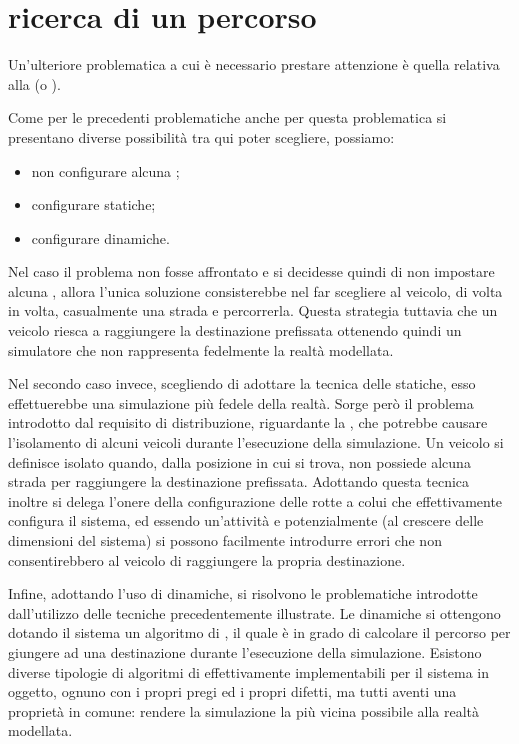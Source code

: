 \section*{ricerca di un percorso}
\label{problematiche_ricerca_di_un_percorso}
Un'ulteriore problematica a cui è necessario prestare attenzione è quella relativa alla  (o ).

Come per le precedenti problematiche anche per questa problematica si presentano diverse possibilità tra qui poter scegliere, possiamo:

\begin{itemize}
\item{non configurare alcuna ;}
\item{configurare  statiche;}
\item{configurare  dinamiche.}
\end{itemize}

Nel caso il problema non fosse affrontato e si decidesse quindi di non impostare alcuna , allora l'unica soluzione consisterebbe nel far scegliere al veicolo, di volta in volta, casualmente una strada e percorrerla. Questa strategia tuttavia  che un veicolo riesca a raggiungere la destinazione prefissata ottenendo quindi un simulatore che non rappresenta fedelmente la realtà modellata.

Nel secondo caso invece, scegliendo di adottare la tecnica delle  statiche, esso effettuerebbe una simulazione più fedele della realtà. Sorge però il problema introdotto dal requisito di distribuzione, riguardante la , che potrebbe causare l'isolamento di alcuni veicoli durante l'esecuzione della simulazione. Un veicolo si definisce isolato quando, dalla posizione in cui si trova, non possiede alcuna strada per raggiungere la destinazione prefissata. Adottando questa tecnica inoltre si delega l'onere della configurazione delle rotte a colui che effettivamente configura il sistema, ed essendo un'attività  e potenzialmente  (al crescere delle dimensioni del sistema) si possono facilmente introdurre errori che non consentirebbero al veicolo di raggiungere la propria destinazione.

Infine, adottando l'uso di  dinamiche, si risolvono le problematiche introdotte dall'utilizzo delle tecniche precedentemente illustrate. Le  dinamiche si ottengono dotando il sistema un algoritmo di , il quale è in grado di calcolare il percorso per giungere ad una destinazione durante l'esecuzione della simulazione. Esistono diverse tipologie di algoritmi di  effettivamente implementabili per il sistema in oggetto, ognuno con i propri pregi ed i propri difetti, ma tutti aventi una proprietà in comune: rendere la simulazione la più vicina possibile alla realtà modellata.

